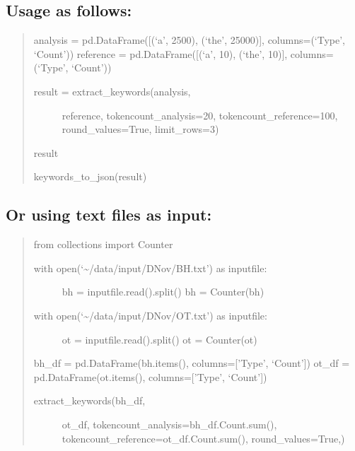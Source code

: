 \documentclass[letterpaper,10pt,english]{sphinxmanual}
\begin{document}
\subsection{Usage as follows:}
\label{apidoc:usage-as-follows}\begin{quote}

analysis = pd.DataFrame({[}(`a', 2500), (`the', 25000){]}, columns=(`Type', `Count'))
reference = pd.DataFrame({[}(`a', 10), (`the', 10){]}, columns=(`Type', `Count'))
\begin{description}
\item[{result = extract\_keywords(analysis, }] \leavevmode
reference, 
tokencount\_analysis=20, 
tokencount\_reference=100, 
round\_values=True, 
limit\_rows=3)

\end{description}

result

keywords\_to\_json(result)
\end{quote}


\subsection{Or using text files as input:}
\label{apidoc:or-using-text-files-as-input}\begin{quote}

from collections import Counter
\begin{description}
\item[{with open(`\textasciitilde{}/data/input/DNov/BH.txt') as inputfile:}] \leavevmode
bh = inputfile.read().split()
bh = Counter(bh)

\item[{with open(`\textasciitilde{}/data/input/DNov/OT.txt') as inputfile:}] \leavevmode
ot = inputfile.read().split()
ot = Counter(ot)

\end{description}

bh\_df  = pd.DataFrame(bh.items(), columns={[}'Type', `Count'{]})
ot\_df  = pd.DataFrame(ot.items(), columns={[}'Type', `Count'{]})
\begin{description}
\item[{extract\_keywords(bh\_df, }] \leavevmode
ot\_df, 
tokencount\_analysis=bh\_df.Count.sum(), 
tokencount\_reference=ot\_df.Count.sum(), 
round\_values=True,)

\end{description}
\end{quote}
\end{document}
